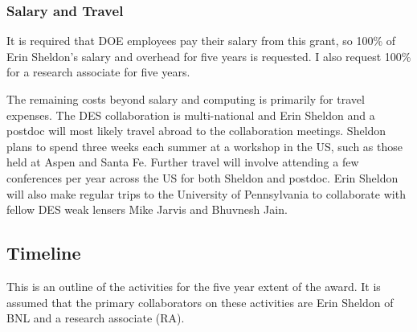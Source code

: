 \documentclass[12pt]{article}
\begin{document}
\subsubsection{Salary and Travel}

It is required that DOE employees pay their salary from this grant, so 100\% of
Erin Sheldon's salary and overhead for five years is requested.  I also request
100\% for a research associate for five years.

The remaining costs beyond salary and computing is primarily for travel
expenses.   The DES collaboration is multi-national and Erin Sheldon and a
postdoc will most likely travel abroad to the collaboration meetings.  Sheldon
plans to spend three weeks each summer at a workshop in the US, such as those
held at Aspen and Santa Fe.  Further travel will involve attending a few
conferences per year across the US for both Sheldon and postdoc.  Erin Sheldon
will also make regular trips to the University of Pennsylvania to collaborate
with fellow DES weak lensers Mike Jarvis and Bhuvnesh Jain.

\clearpage
\newpage
\subsection{Timeline} \label{sec:timeline}

This is an outline of the activities for the five year extent of the award.  It
is assumed that the primary collaborators on these activities are Erin Sheldon
of BNL and a research associate (RA).
\end{document}

